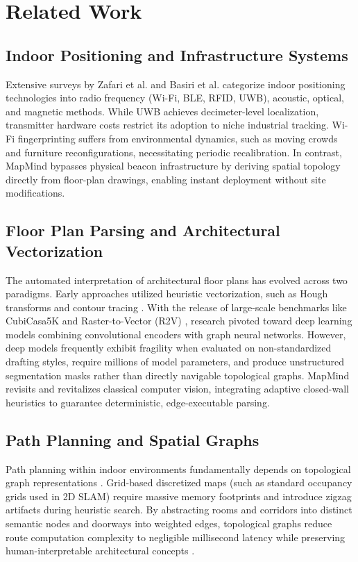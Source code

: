 \documentclass[conference]{IEEEtran}
\begin{document}
\section{Related Work}
\subsection{Indoor Positioning and Infrastructure Systems}
Extensive surveys by Zafari et al. \cite{zafari2019survey} and Basiri et al. \cite{basiri2018indoor} categorize indoor positioning technologies into radio frequency (Wi-Fi, BLE, RFID, UWB), acoustic, optical, and magnetic methods. While UWB achieves decimeter-level localization, transmitter hardware costs restrict its adoption to niche industrial tracking. Wi-Fi fingerprinting suffers from environmental dynamics, such as moving crowds and furniture reconfigurations, necessitating periodic recalibration. In contrast, MapMind bypasses physical beacon infrastructure by deriving spatial topology directly from floor-plan drawings, enabling instant deployment without site modifications.

\subsection{Floor Plan Parsing and Architectural Vectorization}
The automated interpretation of architectural floor plans has evolved across two paradigms. Early approaches utilized heuristic vectorization, such as Hough transforms and contour tracing \cite{mace2010system}. With the release of large-scale benchmarks like CubiCasa5K \cite{kalervo2019cubicasa5k} and Raster-to-Vector (R2V) \cite{liu2017raster}, research pivoted toward deep learning models combining convolutional encoders with graph neural networks. However, deep models frequently exhibit fragility when evaluated on non-standardized drafting styles, require millions of model parameters, and produce unstructured segmentation masks rather than directly navigable topological graphs. MapMind revisits and revitalizes classical computer vision, integrating adaptive closed-wall heuristics to guarantee deterministic, edge-executable parsing.

\subsection{Path Planning and Spatial Graphs}
Path planning within indoor environments fundamentally depends on topological graph representations \cite{hart1968formal}. Grid-based discretized maps (such as standard occupancy grids used in 2D SLAM) require massive memory footprints and introduce zigzag artifacts during heuristic search. By abstracting rooms and corridors into distinct semantic nodes and doorways into weighted edges, topological graphs reduce route computation complexity to negligible millisecond latency while preserving human-interpretable architectural concepts \cite{afzal2014topological}.
\end{document}
